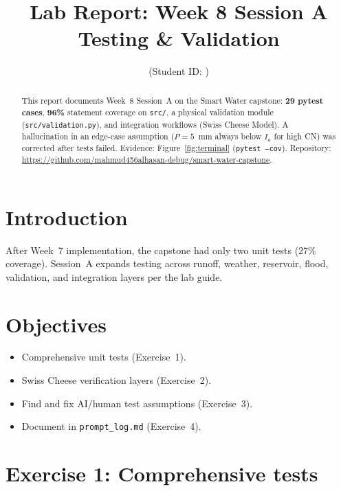 \documentclass[11pt,a4paper]{article}
\title{Lab Report: Week 8 Session A\\Testing \& Validation}
\author{\studentname \quad (Student ID: \studentid)}
\date{\reportdate}
\newcommand{\capstonerepo}{https://github.com/mahmud456alhasan-debug/smart-water-capstone}
\begin{document}
\maketitle

\begin{abstract}
This report documents Week~8 Session~A on the Smart Water capstone: \textbf{29 pytest cases}, \textbf{96\%} statement coverage on \texttt{src/}, a physical validation module (\texttt{src/validation.py}), and integration workflows (Swiss Cheese Model). A hallucination in an edge-case assumption ($P{=}5$~mm always below $I_a$ for high CN) was corrected after tests failed. Evidence: Figure~\ref{fig:terminal} (\texttt{pytest --cov}). Repository: \url{\capstonerepo}.
\end{abstract}

\section{Introduction}
After Week~7 implementation, the capstone had only two unit tests (27\% coverage). Session~A expands testing across runoff, weather, reservoir, flood, validation, and integration layers per the lab guide.

\section{Objectives}
\begin{itemize}[noitemsep]
  \item Comprehensive unit tests (Exercise~1).
  \item Swiss Cheese verification layers (Exercise~2).
  \item Find and fix AI/human test assumptions (Exercise~3).
  \item Document in \texttt{prompt\_log.md} (Exercise~4).
\end{itemize}

\section{Exercise 1: Comprehensive tests}
\end{document}
